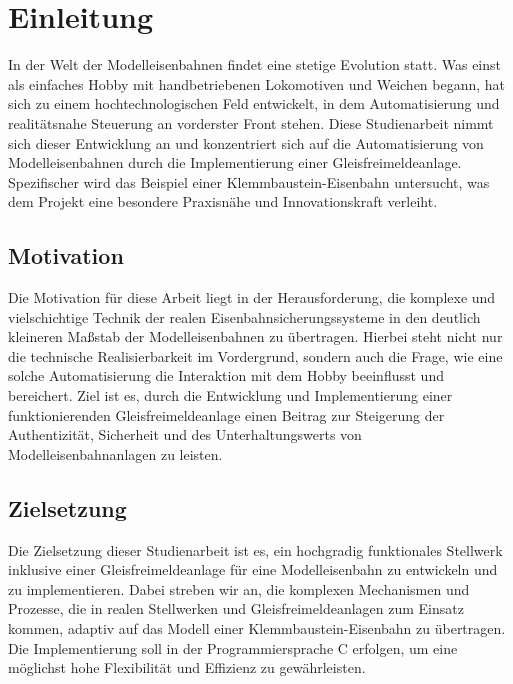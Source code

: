\chapter{Einleitung}\label{text:Einleitung}

In der Welt der Modelleisenbahnen findet eine stetige Evolution statt. Was einst als einfaches Hobby mit handbetriebenen Lokomotiven und Weichen begann, hat sich zu einem hochtechnologischen Feld entwickelt, in dem Automatisierung und realitätsnahe Steuerung an vorderster Front stehen. Diese Studienarbeit nimmt sich dieser Entwicklung an und konzentriert sich auf die Automatisierung von Modelleisenbahnen durch die Implementierung einer Gleisfreimeldeanlage. Spezifischer wird das Beispiel einer Klemmbaustein-Eisenbahn untersucht, was dem Projekt eine besondere Praxisnähe und Innovationskraft verleiht. 

\section{Motivation}\label{text:Einleitung:Motivation}

Die Motivation für diese Arbeit liegt in der Herausforderung, die komplexe und vielschichtige Technik der realen Eisenbahnsicherungssysteme in den deutlich kleineren Maßstab der Modelleisenbahnen zu übertragen. Hierbei steht nicht nur die technische Realisierbarkeit im Vordergrund, sondern auch die Frage, wie eine solche Automatisierung die Interaktion mit dem Hobby beeinflusst und bereichert. Ziel ist es, durch die Entwicklung und Implementierung einer funktionierenden Gleisfreimeldeanlage einen Beitrag zur Steigerung der Authentizität, Sicherheit und des Unterhaltungswerts von Modelleisenbahnanlagen zu leisten.

\section{Zielsetzung}\label{text:Einleitung:Zielsetzung}

Die Zielsetzung dieser Studienarbeit ist es, ein hochgradig funktionales Stellwerk inklusive einer Gleisfreimeldeanlage für eine Modelleisenbahn zu entwickeln und zu implementieren. Dabei streben wir an, die komplexen Mechanismen und Prozesse, die in realen Stellwerken und Gleisfreimeldeanlagen zum Einsatz kommen, adaptiv auf das Modell einer Klemmbaustein-Eisenbahn zu übertragen. Die Implementierung soll in der Programmiersprache C erfolgen, um eine möglichst hohe Flexibilität und Effizienz zu gewährleisten.
\newline

